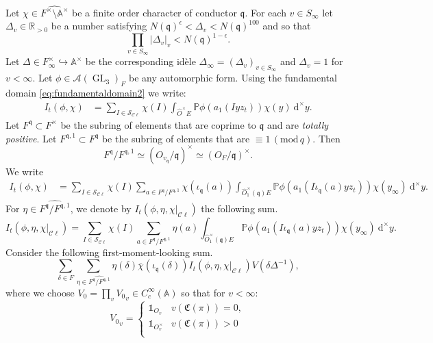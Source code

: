 \documentclass[a4paper,11pt]{amsart}
\theoremstyle{definition}
\newcommand{\A}{\mathbb{A}}
\newcommand{\R}{\mathbb{R}}
\newcommand{\gelle}{\operatorname{GL}}
\newcommand{\cl}{\mathcal{C}\ell}
\newcommand{\mods}[1]{\,(\mathrm{mod}\,{#1})}
\begin{document}
Let $\chi\in \widehat{F^{\times}\setminus\A^{\times}}$ be a finite order character of conductor $\mathfrak{q}$. For each $v\in S_{\infty}$ let $\Delta_v \in \R_{>0}$ be a number satisfying $N(\mathfrak{q})^{\epsilon}< \Delta_v < N(\mathfrak{q})^{100}$ and so that $$\prod_{v\in S_{\infty}}\vert{\Delta_v}\vert_v < N(\mathfrak{q})^{1-\epsilon}.$$ Let $\Delta\in F_{\infty}^{\times}\hookrightarrow \A^{\times}$ be the corresponding idèle $\Delta_{\infty} = (\Delta_v)_{v\in S_{\infty}}$ and $\Delta_v = 1$ for $v<\infty$.
Let $\phi \in \mathcal{A}(\gelle_3)_F$ be any automorphic form.
Using the fundamental domain \eqref{eq:fundamentaldomain2} we write:
\begin{align*}
    I_t(\phi,\chi) &= \sum_{I \in \mathcal{S}_{\cl}}\chi(I) \int_{\widehat{O}^{\times}E}\mathbb{P}\phi(a_1(Iyz_t))\chi(y) \ \mathrm{d}^{\times}y.
    \end{align*}
Let $F^{\mathfrak{q}} \subset F^{\times}$ be the subring of elements that are coprime to $\mathfrak{q}$ and are \emph{totally positive}. Let $F^{\mathfrak{q},1}\subset F^{\mathfrak{q}}$ be the subring of elements that are $\equiv 1 \mods{q}$. Then $$F^{\mathfrak{q}}/F^{\mathfrak{q},1} \simeq (O_{v_\mathfrak{q}}/\mathfrak{q})^{\times} \simeq (O_F/\mathfrak{q})^{\times}.$$ We write     
  \begin{align*}
      I_t(\phi,\chi)&= \sum_{I \in \mathcal{S}_{\cl}}\chi(I)\sum_{a \in F^{\mathfrak{q}}/F^{\mathfrak{q},1}}\chi(\iota_\mathfrak{q}(a))\int_{\widehat{O}^{\times}_1(\mathfrak{q})E}\mathbb{P}\phi(a_1(I\iota_{\mathfrak{q}}(a)yz_t))\chi(y_{\infty}) \ \mathrm{d}^{\times}y.
\end{align*}
For $\eta \in \widehat{F^{\mathfrak{q}}/F^{\mathfrak{q},1}}$, we denote by $I_t(\phi,\eta,\chi|_{\cl})$ the following sum.
\begin{equation*}
    I_t(\phi,\eta,\chi|_{\cl}) = \sum_{I \in \mathcal{S}_{\cl}}\chi(I)\sum_{a \in F^{\mathfrak{q}}/F^{\mathfrak{q},1}}\eta(a)\int_{\widehat{O}^{\times}_1(\mathfrak{q})E}\mathbb{P}\phi(a_1(I\iota_{\mathfrak{q}}(a)yz_t))\chi(y_{\infty}) \ \mathrm{d}^{\times}y.
\end{equation*}
Consider the following first-moment-looking sum.
\begin{equation}\label{eq:Ffirst}
    \sum_{\delta \in F}\sum_{\eta \in \widehat{F^{\mathfrak{q}}/F^{\mathfrak{q},1}}} \eta(\delta)\overline{\chi}(\iota_{\mathfrak{q}}(\delta))I_t(\phi,\eta,\chi|_{\cl})V(\delta \Delta^{-1}),
\end{equation}
where we choose $V_0 = \prod_v{V_0}_v \in C_c^{\infty}(\A)$ so that for $v< \infty$:\begin{equation*}{V_0}_v=\begin{cases}
     \mathbb{1}_{O_v}  &v(\mathfrak{C}(\pi))=0,\\
     \mathbb{1}_{O_v^{\times}} &v(\mathfrak{C}(\pi))>0\\
    \end{cases}\end{equation*}
\end{document}
